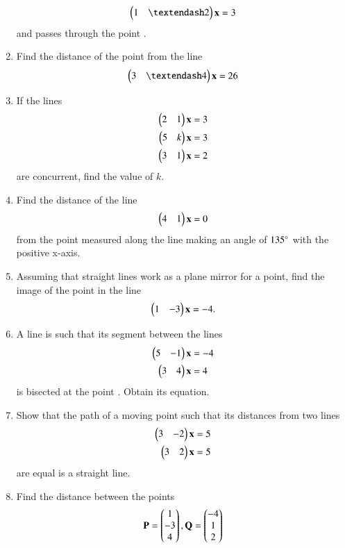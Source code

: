 \begin{enumerate}[label=\arabic*.,ref=\thesubsection.\theenumi]
\begin{align}
\myvec{1 & – 2}\vec{x}  = 3
\end{align}
%
and passes through the point .
\item Find the distance of the point  from the line 
\begin{align}
\myvec{3 & – 4}\vec{x}  = 26
\end{align}
\item If the lines 
\begin{align}
\begin{pmatrix}2 & 1\end{pmatrix}\mathbf{x}  = 3
\\
\begin{pmatrix}5 & k\end{pmatrix}\mathbf{x}  = 3
\\
\begin{pmatrix}3 & 1\end{pmatrix}\mathbf{x}  = 2
\end{align}
%
are concurrent, find the value of $k$.
%
\item Find the distance of the line
\begin{align}
\begin{pmatrix}4 & 1\end{pmatrix}\mathbf{x}  = 0
\end{align}
%
from the point  measured along the line making an angle of $135\degree$ with the positive x-axis.
\item Assuming that straight lines work as a plane mirror for a point, find the image of the point  in the line 
%
\begin{align}
\begin{pmatrix}1 & -3\end{pmatrix}\mathbf{x}  = -4.
\end{align}
%
\item A line is such that its segment between the lines %
\begin{align}
\begin{pmatrix}5 & -1\end{pmatrix}\mathbf{x}  &= -4
\\
\begin{pmatrix}3 & 4\end{pmatrix}\mathbf{x}  &= 4
\end{align}
%
is bisected at the point .  Obtain its equation.
%
\item Show that the path of a moving point such that its distances from two lines
%
\begin{align}
\begin{pmatrix}3 & -2\end{pmatrix}\mathbf{x}  &= 5
\\
\begin{pmatrix}3 & 2\end{pmatrix}\mathbf{x}  &= 5
\end{align}
%
are  equal is a straight line.
%
\item Find the distance between the points
%
\begin{align}
\vec{P} = \myvec{1\\-3\\4},
\vec{Q} = \myvec{-4\\1\\2}

\end{align}
\end{enumerate}
